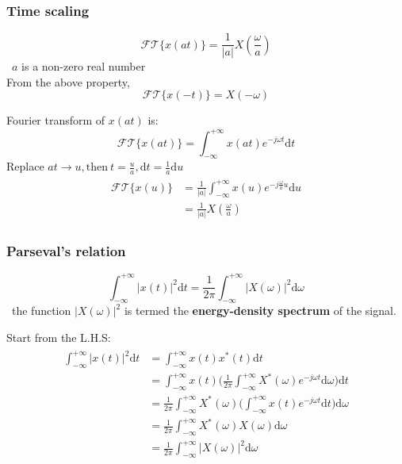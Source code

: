 \subsubsection{Time scaling} 
\[ 
\mathcal{FT} \{ x(at) \} = \frac{1}{\lvert a \rvert}X(\frac{\omega}{a}) 
\]
\ $a$ is a non-zero real number\\

From the above property,
\[ 
\mathcal{FT} \{ x(-t) \} = X(-\omega) 
\]

\begin{dv}{}
    Fourier transform of $x(at)$ is:
    \[ 
    \mathcal{FT}\{x(at)\} =  \int_{-\infty}^{+\infty} x(at) e^{-j\omega t}\mathrm{d}t 
    \]
    Replace $at \to u, \text{then} \ t = \frac{u}{a}, \mathrm{d}t = \frac{1}{a} \mathrm{d}u$
    \begin{align*}
    \begin{split}
        \mathcal{FT}\{x(u)\} 
        &= \frac{1}{\lvert a \rvert} \int_{-\infty}^{+\infty} x(u) e^{-j \frac{\omega}{a}u}\mathrm{d}u \\
        &= \frac{1}{\lvert a \rvert} X(\frac{\omega}{a})
    \end{split}
    \end{align*} 
\end{dv}

\subsubsection{Parseval's relation}
\[ 
    \int_{-\infty}^{+\infty} \lvert x(t) \rvert^{2} \mathrm{d}t = \frac{1}{2\pi} \int_{-\infty}^{+\infty} \lvert X(\omega) \rvert^{2} \mathrm{d}\omega 
\]
\ the function $\lvert X(\omega) \rvert^{2}$ is termed the \textbf{energy-density spectrum} of the signal.
\begin{dv}{}
    Start from the L.H.S:
    \begin{align*} \begin{split}
     \int_{-\infty}^{+\infty} \lvert x(t) \rvert^{2} \mathrm{d}t &= \int_{-\infty}^{+\infty} x(t) x^{*}(t) \mathrm{d}t \\
    &= \int_{-\infty}^{+\infty} x(t) \bigg( \frac{1}{2\pi} \int_{-\infty}^{+\infty} X^{*}(\omega) e^{-j\omega t} \mathrm{d}\omega \bigg) \mathrm{d}t\\
    &= \frac{1}{2\pi} \int_{-\infty}^{+\infty} X^{*}(\omega)\bigg( \int_{-\infty}^{+\infty} x(t) e^{-j\omega t} \mathrm{d}t \bigg) \mathrm{d}\omega \\
    &= \frac{1}{2\pi} \int_{-\infty}^{+\infty} X^{*}(\omega)X(\omega) \mathrm{d}\omega \\
    & = \frac{1}{2\pi} \int_{-\infty}^{+\infty}  \lvert X(\omega) \rvert^{2} \mathrm{d}\omega 
    \end{split} \end{align*}
\end{dv}

